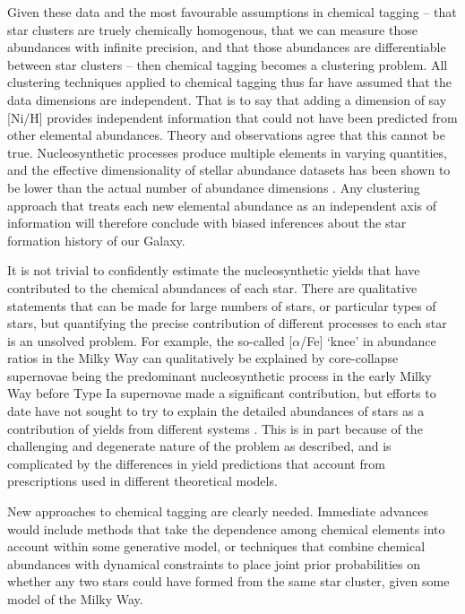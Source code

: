 \documentclass[twocolumn]{aastex62}
\begin{document}
Given these data and the most favourable assumptions in chemical tagging 
-- that star clusters are truely chemically homogenous, that we can measure 
those abundances with infinite precision, and that those abundances are 
differentiable between star clusters -- then chemical
tagging becomes a clustering problem. All clustering techniques applied to 
chemical tagging thus far have assumed that the data dimensions are independent. That is to say
that adding a dimension of say [Ni/H] provides independent information
that could not have been predicted from other elemental abundances.
Theory and observations agree that this cannot be true.
Nucleosynthetic processes produce multiple elements in varying
quantities, and the effective dimensionality of stellar abundance datasets has been shown
to be lower than the actual number of abundance dimensions \citep{Ting:2012,Price-Jones:2018,Milosavljevic:2018}.
Any clustering approach that treats each new elemental abundance as an 
independent axis of information will therefore conclude with biased inferences
about the star formation history of our Galaxy. 


It is not trivial to confidently estimate
the nucleosynthetic yields that have contributed to the chemical abundances of each star. There are
qualitative statements that can be made for large numbers of stars, or particular
types of stars, but quantifying the precise contribution of different processes
to each star is an unsolved problem. For example, the so-called [$\alpha$/Fe] `knee' in
abundance ratios in the Milky Way can qualitatively be explained by 
core-collapse supernovae being the predominant nucleosynthetic process in the
early Milky Way before Type Ia supernovae made a significant contribution, but 
efforts to date have not sought to try to explain the detailed abundances of 
stars as a contribution of yields from different systems \citep[however see][]{West:2013}.
This is in part 
because of the challenging and degenerate nature of the problem as described, 
and is complicated by the differences in yield predictions that account from 
prescriptions used in different theoretical models.


New approaches to chemical tagging are clearly needed. Immediate advances would
include methods that take the dependence among chemical elements into account
within some generative model, or techniques that combine chemical abundances
with dynamical constraints to place joint prior probabilities on whether any
two stars could have formed from the same star cluster, given some model of the
Milky Way. 
\end{document}
